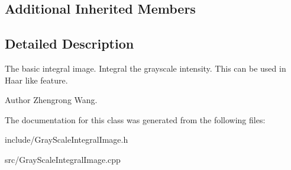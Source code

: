 \subsection*{Additional Inherited Members}


\subsection{Detailed Description}
The basic integral image. Integral the grayscale intensity. This can be used in Haar like feature. \begin{DoxyAuthor}{Author}
Zhengrong Wang. 
\end{DoxyAuthor}


The documentation for this class was generated from the following files\+:\begin{DoxyCompactItemize}
\item 
include/Gray\+Scale\+Integral\+Image.\+h\item 
src/Gray\+Scale\+Integral\+Image.\+cpp\end{DoxyCompactItemize}
